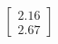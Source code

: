 \documentclass[preview]{standalone}
\begin{document}
\begin{align*}
\begin{bmatrix} 2.16 \\ 2.67 \end{bmatrix}
\end{align*}
\end{document}

